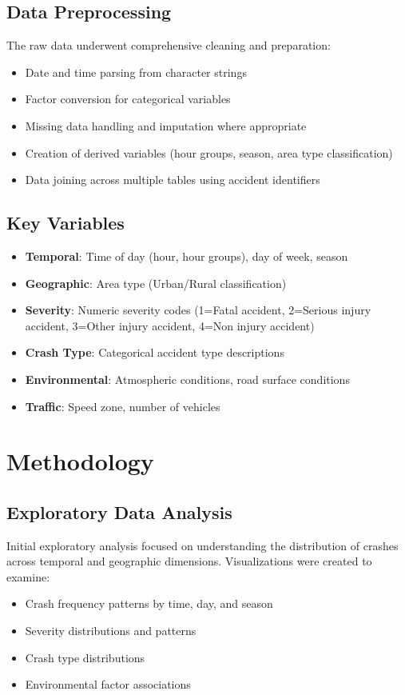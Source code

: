 \documentclass[12pt,a4paper]{article}
\begin{document}
\subsection{Data Preprocessing}
The raw data underwent comprehensive cleaning and preparation:
\begin{itemize}
    \item Date and time parsing from character strings
    \item Factor conversion for categorical variables
    \item Missing data handling and imputation where appropriate
    \item Creation of derived variables (hour groups, season, area type classification)
    \item Data joining across multiple tables using accident identifiers
\end{itemize}

\subsection{Key Variables}
\begin{itemize}
    \item \textbf{Temporal}: Time of day (hour, hour groups), day of week, season
    \item \textbf{Geographic}: Area type (Urban/Rural classification)
    \item \textbf{Severity}: Numeric severity codes (1=Fatal accident, 2=Serious injury accident, 3=Other injury accident, 4=Non injury accident)
    \item \textbf{Crash Type}: Categorical accident type descriptions
    \item \textbf{Environmental}: Atmospheric conditions, road surface conditions
    \item \textbf{Traffic}: Speed zone, number of vehicles
\end{itemize}

\section{Methodology}

\subsection{Exploratory Data Analysis}
Initial exploratory analysis focused on understanding the distribution of crashes across temporal and geographic dimensions. Visualizations were created to examine:
\begin{itemize}
    \item Crash frequency patterns by time, day, and season
    \item Severity distributions and patterns
    \item Crash type distributions
    \item Environmental factor associations
\end{itemize}
\end{document}

